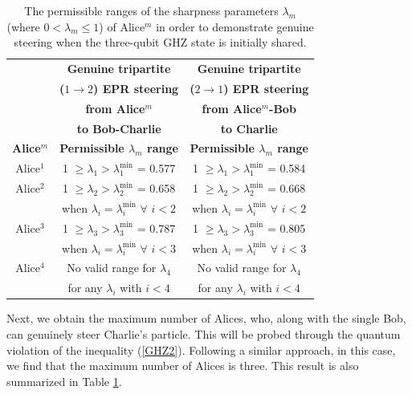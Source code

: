 \documentclass[pra,a4paper,aps,twocolumn,showpacs,superscriptaddress,groupedaddress]{revtex4}
\begin{document}
{\centering
	\begin{table}[t]\footnotesize
			\begin{tabular}{|c | c || c |} 
				\hline 
				& \textbf{Genuine tripartite} & \textbf{Genuine tripartite} \\
				& \textbf{($1 \rightarrow 2$) EPR steering} & \textbf{($2 \rightarrow 1$) EPR steering} \\
				& \textbf{from Alice$^m$} & \textbf{from Alice$^m$-Bob} \\
				& \textbf{to Bob-Charlie} & \textbf{to Charlie} \\
				\hline
				{\bf Alice$^m$} & {\bf Permissible $\lambda_{m}$ range}  & {\bf Permissible $\lambda_{m}$ range}  \\ [0.5ex] 
				\hline
				\hline
				Alice$^1$ &  1 $\geq \lambda_1 > \lambda_1^{\text{min}}$ = 0.577 &  1 $\geq \lambda_1 > \lambda_1^{\text{min}}$ = 0.584  \\ 
				\hline
				Alice$^2$ &1 $\geq \lambda_2 > \lambda_2^{\text{min}}$ = 0.658  & 1 $\geq \lambda_2 > \lambda_2^{\text{min}}$ = 0.668 \\
				& when $\lambda_i = \lambda_i^{\text{min}}$ $\forall$ $i < 2$ & when $\lambda_i = \lambda_i^{\text{min}}$ $\forall$ $i < 2$ \\
				\hline
				Alice$^3$ &1 $\geq \lambda_3 > \lambda_3^{\text{min}}$ = 0.787  & 1 $\geq \lambda_3 > \lambda_3^{\text{min}}$ = 0.805  \\
				& when $\lambda_i = \lambda_i^{\text{min}}$ $\forall$ $i < 3$ & when $\lambda_i = \lambda_i^{\text{min}}$ $\forall$ $i < 3$ \\
				\hline
				Alice$^4$ & No valid range for $\lambda_4$   & No valid range for $\lambda_4$\\
				&  for any $\lambda_i$ with $i<4$ &  for any $\lambda_i$ with $i<4$\\ [1ex]
				\hline
			\end{tabular}
			\caption{The permissible ranges of the sharpness parameters $\lambda_m$ (where $0 < \lambda_m \leq 1$) of Alice$^m$ in order to demonstrate genuine steering when the  three-qubit GHZ state is initially shared.}
			\label{tab1}
	\end{table}
}


 Next, we obtain the maximum number of Alices, who, along with the single Bob, can genuinely steer Charlie's particle. This will be probed through the quantum violation of the inequality (\ref{GHZ2}). Following a similar approach,  in this case, we find that the maximum number of Alices is three. This result is also summarized in Table \ref{tab1}. 
\end{document}
